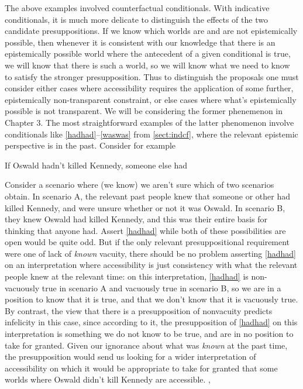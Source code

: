 \documentclass[If.tex]{subfiles}
\begin{document}
The above examples involved counterfactual conditionals. With indicative conditionals, it is much more delicate to distinguish the effects of the two candidate presuppositions. If we know which worlds are and are not epistemically possible, then whenever it is consistent with our knowledge that there is an epistemically possible world where the antecedent of a given conditional is true, we will know that there is such a world, so we will know what we need to know to satisfy the stronger presupposition. Thus to distinguish the proposals one must consider either cases where accessibility requires the application of some further, epistemically non-transparent constraint, or else cases where what's epistemically possible is not transparent. We will be considering the former phenemenon in Chapter 3.  The most straightforward examples of the latter phenomenon involve conditionals like \ref{hadhad}--\ref{waswas} from \autoref{sect:indcf}, where the relevant epistemic perspective is in the past. Consider for example
\begin{prop}
	\sitem[\ref{hadhad}] 
	If Oswald hadn't killed Kennedy, someone else had 
\end{prop}
Consider a scenario where (we know) we aren't sure which of two scenarios obtain. In scenario A, the relevant past people knew that someone or other had killed Kennedy, and were unsure whether or not it was Oswald. In scenario B, they knew Oswald had killed Kennedy, and this was their entire basis for thinking that anyone had. Assert \ref{hadhad} while both of these possibilities are open would be quite odd.  But if the only relevant presuppositional requirement were one of lack of \emph{known} vacuity, there should be no problem asserting \ref{hadhad} on an interpretation where accessibility is just consistency with what the relevant people knew at the relevant time: on this interpretation, \ref{hadhad} is non-vacuously true in scenario A and vacuously true in scenario B, so we are in a position to know that it is true, and that we don't know that it is vacuously true.  By contrast, the view that there is a presupposition of nonvacuity predicts infelicity in this case, since according to it, the presupposition of \ref{hadhad} on this interpretation is something we do not know to be true, and are in no position to take for granted.  Given our ignorance about what was \emph{known} at the past time, the presupposition would send us looking for a wider interpretation of accessibility on which it would be appropriate to take for granted that some worlds where Oswald didn't kill Kennedy are accessible.%
,%
\end{document}
